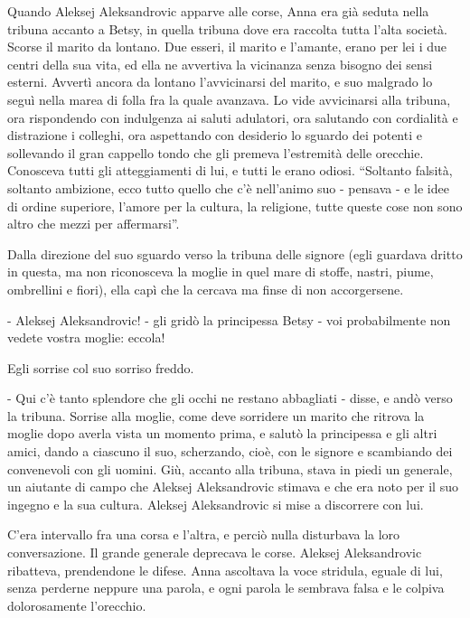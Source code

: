 \label{xxviii-1} 

Quando Aleksej Aleksandrovic apparve alle corse, Anna era già seduta nella tribuna accanto a Betsy, in quella tribuna dove era raccolta tutta l'alta società. Scorse il marito da lontano. Due esseri, il marito e l'amante, erano per lei i due centri della sua vita, ed ella ne avvertiva la vicinanza senza bisogno dei sensi esterni. Avvertì ancora da lontano l'avvicinarsi del marito, e suo malgrado lo seguì nella marea di folla fra la quale avanzava. Lo vide avvicinarsi alla tribuna, ora rispondendo con indulgenza ai saluti adulatori, ora salutando con cordialità e distrazione i colleghi, ora aspettando con desiderio lo sguardo dei potenti e sollevando il gran cappello tondo che gli premeva l'estremità delle orecchie. Conosceva tutti gli atteggiamenti di lui, e tutti le erano odiosi. ``Soltanto falsità, soltanto ambizione, ecco tutto quello che c'è nell'animo suo - pensava - e le idee di ordine superiore, l'amore per la cultura, la religione, tutte queste cose non sono altro che mezzi per affermarsi''. 

Dalla direzione del suo sguardo verso la tribuna delle signore (egli guardava dritto in questa, ma non riconosceva la moglie in quel mare di stoffe, nastri, piume, ombrellini e fiori), ella capì che la cercava ma finse di non accorgersene. 

- Aleksej Aleksandrovic! - gli gridò la principessa Betsy - voi probabilmente non vedete vostra moglie: eccola! 

Egli sorrise col suo sorriso freddo. 

- Qui c'è tanto splendore che gli occhi ne restano abbagliati - disse, e andò verso la tribuna. Sorrise alla moglie, come deve sorridere un marito che ritrova la moglie dopo averla vista un momento prima, e salutò la principessa e gli altri amici, dando a ciascuno il suo, scherzando, cioè, con le signore e scambiando dei convenevoli con gli uomini. Giù, accanto alla tribuna, stava in piedi un generale, un aiutante di campo che Aleksej Aleksandrovic stimava e che era noto per il suo ingegno e la sua cultura. Aleksej Aleksandrovic si mise a discorrere con lui. 

C'era intervallo fra una corsa e l'altra, e perciò nulla disturbava la loro conversazione. Il grande generale deprecava le corse. Aleksej Aleksandrovic ribatteva, prendendone le difese. Anna ascoltava la voce stridula, eguale di lui, senza perderne neppure una parola, e ogni parola le sembrava falsa e le colpiva dolorosamente l'orecchio. 

